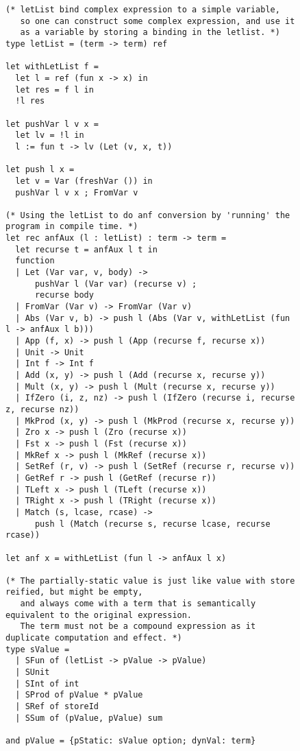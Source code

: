 \begin{figure}[H]
\ContinuedFloat
\begin{verbatim}
(* letList bind complex expression to a simple variable,
   so one can construct some complex expression, and use it
   as a variable by storing a binding in the letlist. *)
type letList = (term -> term) ref

let withLetList f =
  let l = ref (fun x -> x) in
  let res = f l in
  !l res

let pushVar l v x =
  let lv = !l in
  l := fun t -> lv (Let (v, x, t))

let push l x =
  let v = Var (freshVar ()) in
  pushVar l v x ; FromVar v

(* Using the letList to do anf conversion by 'running' the program in compile time. *)
let rec anfAux (l : letList) : term -> term =
  let recurse t = anfAux l t in
  function
  | Let (Var var, v, body) ->
      pushVar l (Var var) (recurse v) ;
      recurse body
  | FromVar (Var v) -> FromVar (Var v)
  | Abs (Var v, b) -> push l (Abs (Var v, withLetList (fun l -> anfAux l b)))
  | App (f, x) -> push l (App (recurse f, recurse x))
  | Unit -> Unit
  | Int f -> Int f
  | Add (x, y) -> push l (Add (recurse x, recurse y))
  | Mult (x, y) -> push l (Mult (recurse x, recurse y))
  | IfZero (i, z, nz) -> push l (IfZero (recurse i, recurse z, recurse nz))
  | MkProd (x, y) -> push l (MkProd (recurse x, recurse y))
  | Zro x -> push l (Zro (recurse x))
  | Fst x -> push l (Fst (recurse x))
  | MkRef x -> push l (MkRef (recurse x))
  | SetRef (r, v) -> push l (SetRef (recurse r, recurse v))
  | GetRef r -> push l (GetRef (recurse r))
  | TLeft x -> push l (TLeft (recurse x))
  | TRight x -> push l (TRight (recurse x))
  | Match (s, lcase, rcase) ->
      push l (Match (recurse s, recurse lcase, recurse rcase))

let anf x = withLetList (fun l -> anfAux l x)

(* The partially-static value is just like value with store reified, but might be empty,
   and always come with a term that is semantically equivalent to the original expression.
   The term must not be a compound expression as it duplicate computation and effect. *)
type sValue =
  | SFun of (letList -> pValue -> pValue)
  | SUnit
  | SInt of int
  | SProd of pValue * pValue
  | SRef of storeId
  | SSum of (pValue, pValue) sum

and pValue = {pStatic: sValue option; dynVal: term}
\end{verbatim}
\end{figure}

